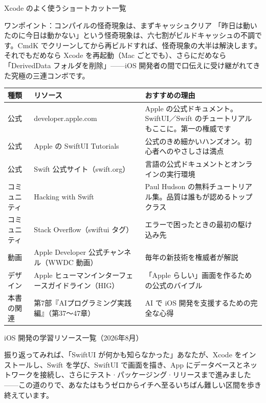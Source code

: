 \begin{center}\small\color{gray}Xcode のよく使うショートカット一覧\end{center}

\begin{tcbinfo}{ワンポイント：コンパイルの怪奇現象は、まずキャッシュクリア}
「昨日は動いたのに今日は動かない」という怪奇現象は、六七割がビルドキャッシュの不調です。CmdK でクリーンしてから再ビルドすれば、怪奇現象の大半は解決します。それでもだめなら Xcode を再起動（Mac ごとでも）、さらにだめなら「DerivedData フォルダを削除」——iOS 開発者の間で口伝えに受け継がれてきた究極の三連コンボです。

\end{tcbinfo}



\begin{center}
\begin{tabularx}{\linewidth}{|X|X|X|}
\hline
\textbf{種類} & \textbf{リソース} & \textbf{おすすめの理由} \tabularnewline
\hline
公式 & developer.apple.com & Apple の公式ドキュメント。SwiftUI／Swift のチュートリアルもここに。第一の権威です \tabularnewline
公式 & Apple の SwiftUI Tutorials & 公式のきめ細かいハンズオン。初心者へのやさしさは満点 \tabularnewline
公式 & Swift 公式サイト（swift.org） & 言語の公式ドキュメントとオンラインの実行環境 \tabularnewline
コミュニティ & Hacking with Swift & Paul Hudson の無料チュートリアル集。品質は誰もが認めるトップクラス \tabularnewline
コミュニティ & Stack Overflow（swiftui タグ） & エラーで困ったときの最初の駆け込み先 \tabularnewline
動画 & Apple Developer 公式チャンネル（WWDC 動画） & 毎年の新技術を権威者が解説 \tabularnewline
デザイン & Apple ヒューマンインターフェースガイドライン（HIG） & 「Apple らしい」画面を作るための公式のバイブル \tabularnewline
本書の関連 & 第7部『AIプログラミング実践編』（第37〜47章） & AI で iOS 開発を支援するための完全な心得 \tabularnewline
\hline
\end{tabularx}
\end{center}

\begin{center}\small\color{gray}iOS 開発の学習リソース一覧（2026年8月）\end{center}


振り返ってみれば、「SwiftUI が何かも知らなかった」あなたが、Xcode をインストールし、Swift を学び、SwiftUI で画面を描き、App にデータベースとネットワークを接続し、さらにテスト·パッケージング·リリースまで進みました——この道のりで、あなたはもうゼロからイチへ至るいちばん難しい区間を歩き終えています。

